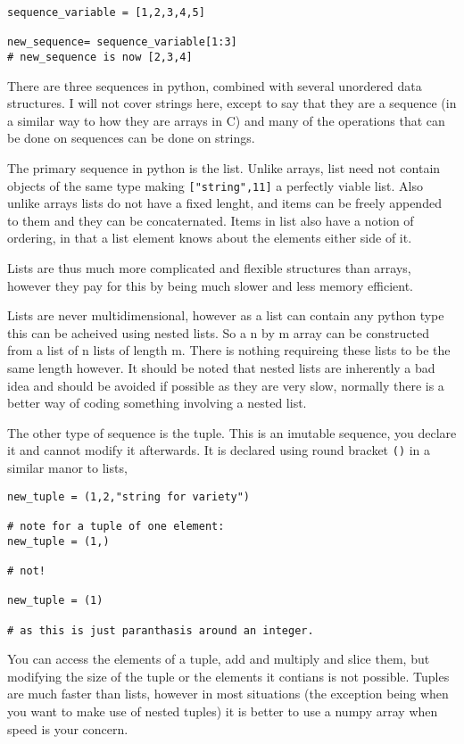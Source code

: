 \documentclass[11pt,a4paper]{article}
\begin{document}
\begin{verbatim}
sequence_variable = [1,2,3,4,5]

new_sequence= sequence_variable[1:3]
# new_sequence is now [2,3,4]
\end{verbatim} 

There are three sequences in python, combined with several unordered data structures. I will not cover strings here, except to say that they are a sequence (in a similar way to how they are arrays in C) and many of the operations that can be done on sequences can be done on strings.

The primary sequence in python is the list. Unlike arrays, list need not contain objects of the same type making \verb|["string",11]| a perfectly viable list. Also unlike arrays lists do not have a fixed lenght, and items can be freely appended to them and they can be concaternated. Items in list also have a notion of ordering, in that a list element knows about the elements either side of it.

Lists are thus much more complicated and flexible structures than arrays, however they pay for this by being much slower and less memory efficient.

Lists are never multidimensional, however as a list can contain any python type this can be acheived using nested lists. So a n by m array can be constructed from a list of n lists of length m. There is nothing requireing these lists to be the same length however. It should be noted that nested lists are inherently a bad idea and should be avoided if possible as they are very slow, normally there is a better way of coding something involving a nested list.

The other type of sequence is the tuple. This is an imutable sequence, you declare it and cannot modify it afterwards. It is declared using round bracket \verb|()| in a similar manor to lists,

\begin{verbatim}
new_tuple = (1,2,"string for variety")

# note for a tuple of one element:
new_tuple = (1,)

# not!

new_tuple = (1)

# as this is just paranthasis around an integer.

\end{verbatim}

You can access the elements of a tuple, add and multiply and slice them, but modifying the size of the tuple or the elements it contians is not possible. Tuples are much faster than lists, however in most situations (the exception being when you want to make use of nested tuples) it is better to use a numpy array when speed is your concern.
\end{document}

